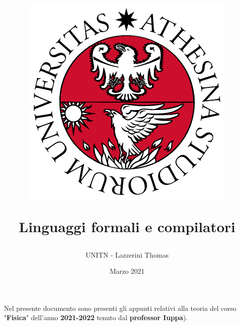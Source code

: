 \documentclass[12pt]{article}
\title{
    \begin{figure}[ht!]
        \centering
        \includegraphics[width=.5\textwidth]{LOGO}
        \label{fig:logo unitn}
    \end{figure}
    \bigskip
    Linguaggi formali e compilatori
}
\author{UNITN - Lazzerini Thomas}
\date{Marzo 2021}
\begin{document}
    \maketitle
    \vfill

    \begin{center}
        Nel presente documento sono presenti gli appunti relativi alla teoria del corso "\textbf{Fisica}" dell'anno \textbf{2021-2022} tenuto dal \textbf{professor Iuppa}).\\
    \end{center}

    \newpage

    \tableofcontents

    \newpage

	
	
	
\end{document}

